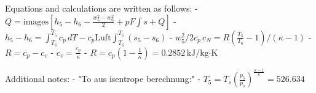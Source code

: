 Equations and calculations are written as follows:  
- \( Q = \text{images} \left[ h_5 - h_6 - \frac{w_5^2 - w_6^2}{2} + pF \int s + Q \right] \)  
- \( h_5 - h_6 = \int_{T_6}^{T_5} c_p \, dT - c_p \text{Luft} \int_{T_6}^{T_5} (s_5 - s_6) \)  
- \( w_5^2 / 2c_p \, c_N = R \left( \frac{T_5}{T_6} - 1 \right) / (\kappa - 1) \)  
- \( R = c_p - c_v \)  
- \( c_v = \frac{c_p}{\kappa} \)  
- \( R = c_p \left( 1 - \frac{1}{\kappa} \right) = 0.2852 \, \text{kJ/kg·K} \)  

Additional notes:  
- "To aus isentrope berechnung:"  
- \( T_5 = T_s \left( \frac{p_5}{p_s} \right)^{\frac{\kappa - 1}{\kappa}} = 526.634 \)